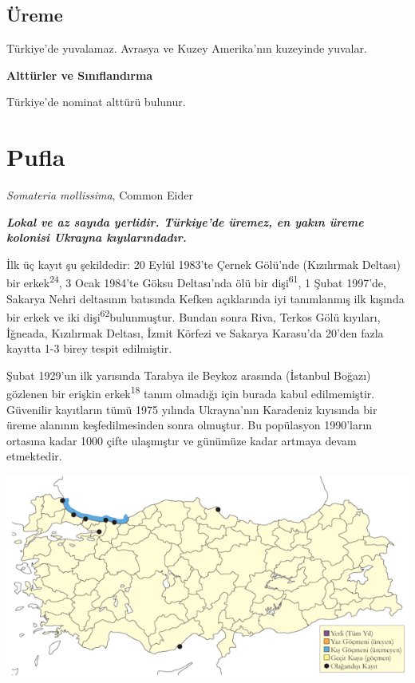 \documentclass[
  letterpaper,
  DIV=11,
  numbers=noendperiod]{scrreprt}
\begin{document}
\hypertarget{uxfcreme-25}{%
\subsection{\texorpdfstring{\textbf{Üreme}}{Üreme}}\label{uxfcreme-25}}

Türkiye'de yuvalamaz. Avrasya ve Kuzey Amerika'nın kuzeyinde yuvalar.

\textbf{Alttürler ve Sınıflandırma}

Türkiye'de nominat alttürü bulunur.

\hypertarget{pufla}{%
\section{Pufla}\label{pufla}}

\emph{Somateria mollissima}, Common Eider

\textbf{\emph{Lokal ve az sayıda yerlidir. Türkiye'de üremez, en yakın
üreme kolonisi Ukrayna kıyılarındadır.}}

İlk üç kayıt şu şekildedir: 20 Eylül 1983'te Çernek Gölü'nde (Kızılırmak
Deltası) bir erkek\textsuperscript{24}, 3 Ocak 1984'te Göksu Deltası'nda
ölü bir dişi\textsuperscript{61}, 1 Şubat 1997'de, Sakarya Nehri
deltasının batısında Kefken açıklarında iyi tanımlanmış ilk kışında bir
erkek ve iki dişi\textsuperscript{62}bulunmuştur. Bundan sonra Riva,
Terkos Gölü kıyıları, İğneada, Kızılırmak Deltası, İzmit Körfezi ve
Sakarya Karasu'da 20'den fazla kayıtta 1-3 birey tespit edilmiştir.

Şubat 1929'un ilk yarısında Tarabya ile Beykoz arasında (İstanbul
Boğazı) gözlenen bir erişkin erkek\textsuperscript{18} tanım olmadığı
için burada kabul edilmemiştir. Güvenilir kayıtların tümü 1975 yılında
Ukrayna'nın Karadeniz kıyısında bir üreme alanının keşfedilmesinden
sonra olmuştur. Bu popülasyon 1990'ların ortasına kadar 1000 çifte
ulaşmıştır ve günümüze kadar artmaya devam etmektedir.

\includegraphics{images/harita_Page_027.png}
\end{document}
